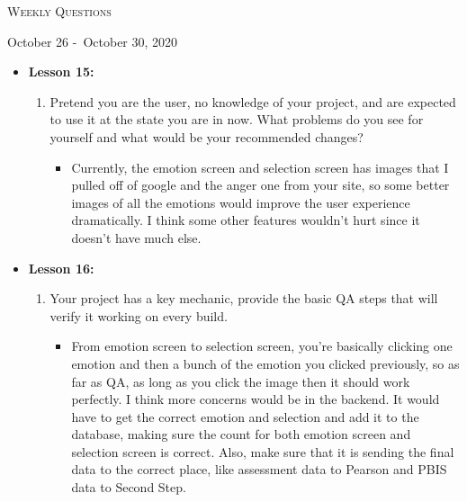 \centerline{\LARGE\textsc{Weekly Questions}}
\centerline{October 26 -\ October 30, 2020}
\textbf{}
\begin{itemize}
  \item[] \textbf{\large Lesson 15:}
  \begin{enumerate}
    \item Pretend you are the user, no knowledge of your project, and are expected to use it at the state you are in now. What problems do you see for yourself and what would be your recommended changes?
    \begin{itemize}
      \item Currently, the emotion screen and selection screen has images that I pulled off of google and the anger one from your site, so some better images of all the emotions would improve the user experience dramatically.
      I think some other features wouldn't hurt since it doesn't have much else.
    \end{itemize}
  \end{enumerate} 
\end{itemize}
\begin{itemize}
  \item[] \textbf{\large Lesson 16:}
  \begin{enumerate}
    \item Your project has a key mechanic, provide the basic QA steps that will verify it working on every build.
    \begin{itemize}
      \item From emotion screen to selection screen, you're basically clicking one emotion and then a bunch of the emotion you clicked previously, so as far as QA, as long as you click the image then it should work perfectly. I think more concerns would be in the backend. It would have to get the correct emotion and selection and add it to the database, making sure the count for both emotion screen and selection screen is correct. Also, make sure that it is sending the final data to the correct place, like assessment data to Pearson and PBIS data to Second Step.
    \end{itemize}
  \end{enumerate} 
\end{itemize}
